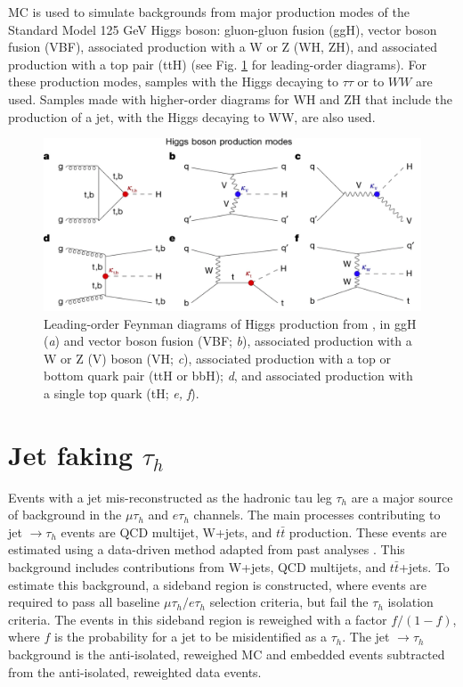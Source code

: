 MC is used to simulate backgrounds from major production modes of the Standard Model 125 GeV Higgs boson: gluon-gluon fusion (ggH), vector boson fusion (VBF), associated production with a W or Z (WH, ZH), and associated production with a top pair (ttH) (see Fig. \ref{fig:higgs-boson-production-modes} for leading-order diagrams). For these production modes, samples with the Higgs decaying to $\tau\tau$ or to $WW$ are used. Samples made with higher-order diagrams for WH and ZH that include the production of a jet, with the Higgs decaying to WW, are also used.

\begin{figure}[ht]
    \centering
    \includegraphics[width=15cm]{figures/ch-7-background-estimation/higgs-boson-production-modes.png}
    \caption[Leading-order Feynman diagrams of Higgs production.]{Leading-order Feynman diagrams of Higgs production from \cite{CMS-HIG-22-001}, in ggH (\textit{a}) and vector boson fusion (VBF; \textit{b}), associated production with a W or Z (V) boson (VH; \textit{c}), associated production with a top or bottom quark pair (ttH or bbH); \textit{d}, and associated production with a single top quark (tH; \textit{e, f}).} 

     \label{fig:higgs-boson-production-modes}
\end{figure}

\section{Jet faking \texorpdfstring{$\tau_{h}$}{tauh}}
\label{section:ch-7-jet-faking-tauh-background}
Events with a jet mis-reconstructed as the hadronic tau leg $\tau_{h}$ are a major source of background in the $\mu\tau_{h}$ and $e\tau_{h}$ channels. The main processes contributing to jet $\rightarrow \tau_{h}$ events are QCD multijet, W+jets, and $t\bar{t}$ production. These events are estimated using a data-driven method adapted from past analyses \cite{CMS-HIG-19-010} \cite{CMS-HIG-17-024}. This background includes contributions from W+jets, QCD multijets, and $t\bar{t}$+jets. To estimate this background, a sideband region is constructed, where events are required to pass all baseline $\mu\tau_{h}/ e\tau_{h}$ selection criteria, but fail the $\tau_{h}$ isolation criteria. The events in this sideband region is reweighed with a factor $f/(1-f)$, where $f$ is the probability for a jet to be misidentified as a $\tau_{h}$. The jet $\rightarrow \tau_{h}$ background is the anti-isolated, reweighed MC and embedded events subtracted from the anti-isolated, reweighted data events.

